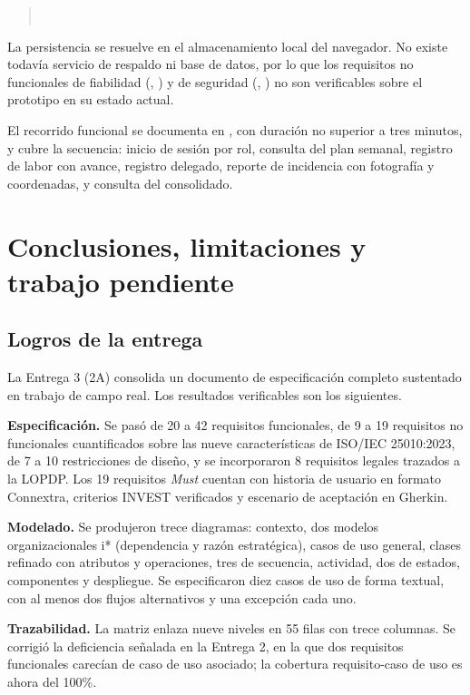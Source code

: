 \begin{quote}
\\
\end{quote}

\noindent
La persistencia se resuelve en el almacenamiento local del navegador. No existe todavía servicio de
respaldo ni base de datos, por lo que los requisitos no funcionales de fiabilidad
(, ) y de seguridad (, ) no son verificables sobre el
prototipo en su estado actual.

El recorrido funcional se documenta en , con duración no superior a tres
minutos, y cubre la secuencia: inicio de sesión por rol, consulta del plan semanal, registro de
labor con avance, registro delegado, reporte de incidencia con fotografía y coordenadas, y consulta
del consolidado.

\newpage
\section{Conclusiones, limitaciones y trabajo pendiente}

\subsection{Logros de la entrega}

La Entrega 3 (2A) consolida un documento de especificación completo sustentado en trabajo de campo
real. Los resultados verificables son los siguientes.

\textbf{Especificación.} Se pasó de 20 a 42 requisitos funcionales, de 9 a 19 requisitos no
funcionales cuantificados sobre las nueve características de ISO/IEC 25010:2023, de 7 a 10
restricciones de diseño, y se incorporaron 8 requisitos legales trazados a la LOPDP. Los 19
requisitos \emph{Must} cuentan con historia de usuario en formato Connextra, criterios INVEST
verificados y escenario de aceptación en Gherkin.

\textbf{Modelado.} Se produjeron trece diagramas: contexto, dos modelos organizacionales i*
(dependencia y razón estratégica), casos de uso general, clases refinado con atributos y
operaciones, tres de secuencia, actividad, dos de estados, componentes y despliegue. Se especificaron
diez casos de uso de forma textual, con al menos dos flujos alternativos y una excepción cada uno.

\textbf{Trazabilidad.} La matriz enlaza nueve niveles en 55 filas con trece columnas. Se corrigió la
deficiencia señalada en la Entrega 2, en la que dos requisitos funcionales carecían de caso de uso
asociado; la cobertura requisito-caso de uso es ahora del 100\%.

